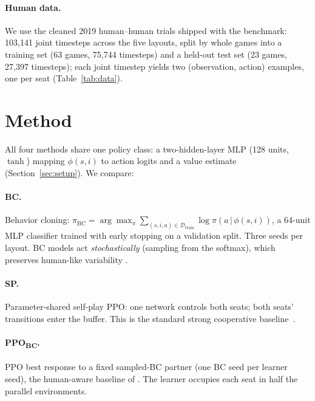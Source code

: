 \documentclass[11pt]{article}
\newcommand{\hproxy}{$H_{\text{proxy}}$}
\newcommand{\ppobc}{PPO\textsubscript{BC}}
\begin{document}
\paragraph{Human data.}
We use the cleaned 2019 human--human trials shipped with the benchmark:
103{,}141 joint timesteps across the five layouts, split by whole games into
a training set (63 games, 75{,}744 timesteps) and a held-out test set
(23 games, 27{,}397 timesteps); each joint timestep yields two
(observation, action) examples, one per seat (Table~\ref{tab:data}).

\begin{table}[t]
\centering
\caption{The 2019 Overcooked human--human dataset~\citep{carroll2019utility}
as used here: whole-game train/test split; each joint timestep contributes
one sample per seat. BC human models are fit on the train split; the
evaluation proxies \hproxy{} are fit on the test split.}
\label{tab:data}
\small

\end{table}

\section{Method}
\label{sec:method}

All four methods share one policy class: a two-hidden-layer MLP
(128 units, $\tanh$) mapping $\phi(s,i)$ to action logits and a value
estimate (Section~\ref{sec:setup}). We compare:

\paragraph{BC.}
Behavior cloning: $\pi_{\mathrm{BC}}=\arg\max_\pi
\sum_{(s,i,a)\in\mathcal{D}_{\mathrm{train}}}\log\pi(a\,|\,\phi(s,i))$,
a 64-unit MLP classifier trained with early stopping on a validation split.
Three seeds per layout. BC models act \emph{stochastically} (sampling from
the softmax), which preserves human-like variability
\citep{carroll2019utility}.

\paragraph{SP.}
Parameter-shared self-play PPO: one network controls both seats; both seats'
transitions enter the buffer. This is the standard strong cooperative
baseline~\citep{yu2022surprising}.

\paragraph{\ppobc{}.}
PPO best response to a fixed sampled-BC partner (one BC seed per learner
seed), the human-aware baseline of \citet{carroll2019utility}. The learner
occupies each seat in half the parallel environments.
\end{document}
